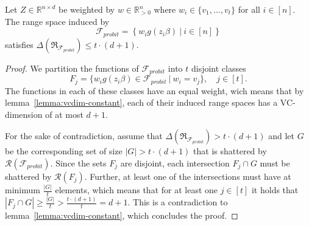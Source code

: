 \begin{lemma}
    Let $Z \in \mathbb{R}^{n \times d}$ be weighted by
    $w \in \mathbb{R}^n_{>0}$ where $w_i \in \{ v_1, ..., v_t \}$ for
    all $i \in [n]$.
    The range space induced by
    \begin{equation*}
        \mathcal{F}_{probit} = \left\{ w_ig(z_i\beta) \ |\ i \in [n] \right\}
    \end{equation*}
    satisfies
    $\Delta(\mathfrak{R}_{\mathcal{F}_{probit}}) \leq t \cdot (d + 1)$.
\end{lemma}
\begin{proof}
    We partition the functions of $\mathcal{F}_{probit}$ into $t$ disjoint
    classes
    \begin{equation*}
        F_j = \{ w_ig(z_i\beta) \in \mathcal{F}_{probit} \
        |\ w_i = v_j \},\quad j \in [t].
    \end{equation*}
    The functions in each of these classes have an equal
    weight, wich means that by lemma~\ref{lemma:vcdim-constant}, each of
    their induced range spaces has a VC-dimension of at most $d+1$.

    For the sake of contradiction, assume that
    $\Delta(\mathfrak{R}_{\mathcal{F}_{probit}}) > t \cdot (d + 1)$ and let
    $G$ be the corresponding set of size $|G| > t \cdot (d + 1)$ that
    is shattered by $\mathcal{R}(\mathcal{F}_{probit})$.
    Since the sets $F_j$ are disjoint, each intersection
    $F_j \cap G$ must be shattered by $\mathcal{R}(F_j)$.
    Further, at least one of the intersections must have at minimum
    $\frac{|G|}{t}$ elements, which means that for at least one $j \in [t]$
    it holds that
    $|F_j \cap G| \geq \frac{|G|}{t} > \frac{t \cdot (d+1)}{t} = d + 1$.
    This is a contradiction to lemma~\ref{lemma:vcdim-constant}, which
    concludes the proof.
\end{proof}